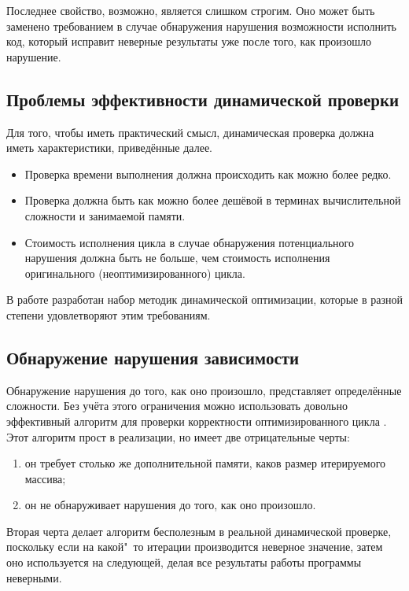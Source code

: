 Последнее свойство, возможно, является слишком строгим. Оно может быть заменено требованием в случае обнаружения нарушения возможности исполнить код, который исправит неверные результаты уже после того, как произошло нарушение.

\subsection{Проблемы эффективности динамической проверки}

Для того, чтобы иметь практический смысл, динамическая проверка должна иметь характеристики, приведённые далее.

\begin{itemize}
	\item Проверка времени выполнения должна происходить как можно более редко.
	\item Проверка должна быть как можно более дешёвой в терминах вычислительной сложности и занимаемой памяти.
	\item Стоимость исполнения цикла в случае обнаружения потенциального нарушения должна быть не больше, чем стоимость исполнения оригинального (неоптимизированного) цикла.
\end{itemize}

В работе \cite{ZuckPFGH02} разработан набор методик динамической оптимизации, которые в разной степени удовлетворяют этим требованиям.

\subsection{Обнаружение нарушения зависимости}

Обнаружение нарушения до того, как оно произошло, представляет определённые сложности. Без учёта этого ограничения можно использовать довольно эффективный алгоритм для проверки корректности оптимизированного цикла \cite{ZuckPFGH02}. Этот алгоритм прост в реализации, но имеет две отрицательные черты:

\begin{enumerate}
	\item он требует столько же дополнительной памяти, каков размер итерируемого массива;
	\item он не обнаруживает нарушения до того, как оно произошло.
\end{enumerate}

Вторая черта делает алгоритм бесполезным в реальной динамической проверке, поскольку если на какой"~то итерации производится неверное значение, затем оно используется на следующей, делая все результаты работы программы неверными.

